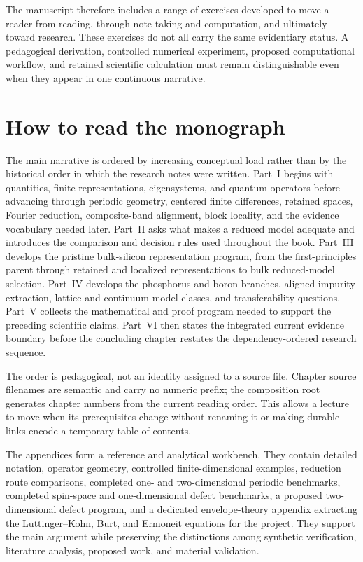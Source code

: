 The manuscript therefore includes a range of exercises developed to move a
reader from reading, through note-taking and computation, and ultimately toward
research. These exercises do not all carry the same evidentiary status. A
pedagogical derivation, controlled numerical experiment, proposed computational
workflow, and retained scientific calculation must remain distinguishable even
when they appear in one continuous narrative.

\section*{How to read the monograph}

The main narrative is ordered by increasing conceptual load rather than by the
historical order in which the research notes were written. Part~I begins with
quantities, finite representations, eigensystems, and quantum operators before
advancing through periodic geometry, centered finite differences, retained
spaces, Fourier reduction, composite-band alignment, block locality, and the
evidence vocabulary needed later. Part~II asks what makes a reduced model
adequate and introduces the comparison and decision rules used throughout the
book. Part~III develops the pristine bulk-silicon representation program, from
the first-principles parent through retained and localized representations to
bulk reduced-model selection. Part~IV develops the phosphorus and boron
branches, aligned impurity extraction, lattice and continuum model classes, and
transferability questions. Part~V collects the mathematical and proof program
needed to support the preceding scientific claims. Part~VI then states the
integrated current evidence boundary before the concluding chapter restates the
dependency-ordered research sequence.

The order is pedagogical, not an identity assigned to a source file. Chapter
source filenames are semantic and carry no numeric prefix; the composition root
generates chapter numbers from the current reading order. This allows a lecture
to move when its prerequisites change without renaming it or making durable
links encode a temporary table of contents.

The appendices form a reference and analytical workbench. They contain detailed
notation, operator geometry, controlled finite-dimensional examples, reduction
route comparisons, completed one- and two-dimensional periodic benchmarks,
completed spin-space and one-dimensional defect benchmarks, a proposed
two-dimensional defect program, and a dedicated envelope-theory appendix
extracting the Luttinger--Kohn, Burt, and Ermoneit equations for the project.
They support the main argument while preserving the distinctions among
synthetic verification, literature analysis, proposed work, and material
validation.

